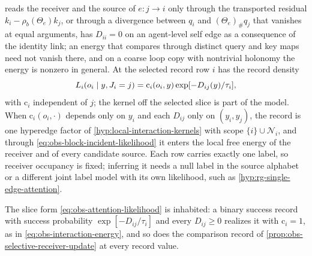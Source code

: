 reads the receiver and the source of \(e:j\to i\) only through the transported
residual \(k_i-\rho_b(\Theta_e)k_j\), or through a divergence between \(q_i\)
and \((\Theta_e)_\#q_j\) that vanishes at equal arguments, has \(D_{ii}=0\) on
an agent-level self edge as a consequence of the identity link; an energy that
compares through distinct query and key maps need not vanish there, and on a
coarse loop copy with nontrivial holonomy the energy is nonzero in general.
At the selected
record row \(i\) has the record density
\begin{equation}
L_i(o_i\mid y,J_i=j)
=\mathrm c_i(o_i,y)\exp[-D_{ij}(y)/\tau_i],
\label{eq:obs-attention-likelihood}
\end{equation}
with \(\mathrm c_i\) independent of \(j\); the kernel off the selected slice is
part of the model. When \(\mathrm c_i(o_i,\cdot)\) depends only on \(y_i\) and
each \(D_{ij}\) only on \((y_i,y_j)\), the record is one hyperedge factor of
\cref{hyp:local-interaction-kernels} with scope \(\{i\}\cup\mathcal N_i\), and
through \eqref{eq:obs-block-incident-likelihood} it enters the local free
energy of the receiver and of every candidate source. Each row carries exactly
one label, so receiver occupancy is fixed; inferring it needs a null label in
the source alphabet or a different joint label model with its own likelihood,
such as \cref{hyp:rg-single-edge-attention}.

The slice form \eqref{eq:obs-attention-likelihood} is inhabited: a binary
success record with success probability \(\exp[-D_{ij}/\tau_i]\) and every
\(D_{ij}\ge0\) realizes it with \(\mathrm c_i=1\), as in
\eqref{eq:obs-interaction-energy}, and so does the comparison record of
\cref{prop:obs-selective-receiver-update} at every record value.


